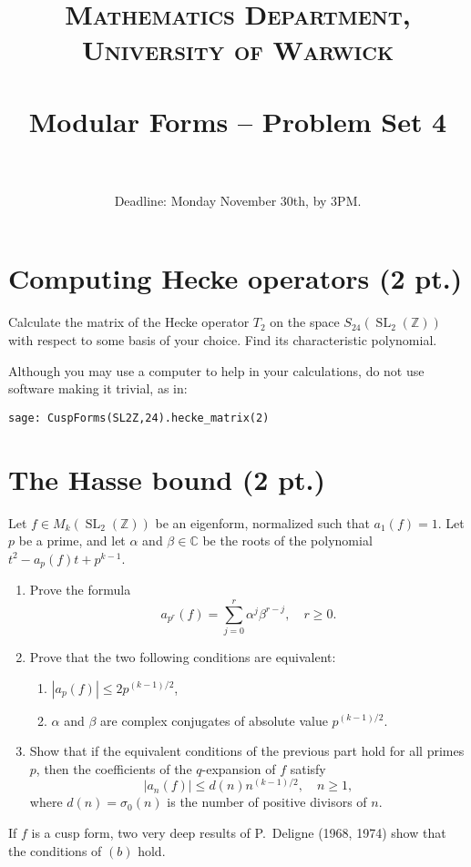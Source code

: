 \documentclass[paper=a4, fontsize=11pt]{scrartcl} %
\title{	
\normalfont \normalsize 
\textsc{Mathematics Department, University of Warwick} \\ [20pt] %
\horrule{0.5pt} \\[0.4cm] %
\huge Modular Forms -- Problem Set 4 \\ %
\horrule{2pt} \\ %
}
\date{Deadline: Monday November 30th, by 3PM.}
\numberwithin{equation}{section} %
\numberwithin{figure}{section} %
\numberwithin{table}{section} %
\newcommand{\bbC}{\mathbb{C}}
\newcommand{\bbZ}{\mathbb{Z}}
\newcommand{\CC}{\bbC}
\newcommand{\ZZ}{\bbZ}
\DeclareMathOperator{\SL}{SL}
\begin{document}
\maketitle %


\section{Computing Hecke operators (2 pt.)}
Calculate the matrix of the Hecke operator $T_2$ on the space $S_{24}(\SL_2(\ZZ))$ with respect to some basis of your choice. Find its characteristic polynomial.

Although you may use a computer to help in your calculations, do not use software making it trivial, as in:
\begin{verbatim}
sage: CuspForms(SL2Z,24).hecke_matrix(2)
\end{verbatim}


\section{The Hasse bound (2 pt.)}
Let $f\in M_k(\SL_2(\ZZ))$ be an eigenform, normalized such that $a_1(f)=1$. Let $p$ be a prime, and let $\alpha$ and $\beta\in \CC$ be the roots of the polynomial $t^2-a_p(f)t+p^{k-1}$.
\begin{enumerate}
\item Prove the formula
\[
a_{p^r}(f) = \sum_{j=0}^r \alpha^j \beta^{r-j},\quad r\geq 0.
\]
\item Prove that the two following conditions are equivalent:
  \begin{enumerate}
  \item $|a_p(f)|\leq 2p^{(k-1)/2}$,
  \item $\alpha$ and $\beta$ are complex conjugates of absolute value $p^{(k-1)/2}$.
  \end{enumerate}
\item Show that if the equivalent conditions of the previous part hold for all primes $p$, then the coefficients of the $q$-expansion of $f$ satisfy
\[
|a_n(f)|\leq d(n)n^{(k-1)/2},\quad n\geq 1,
\]
where $d(n)=\sigma_0(n)$ is the number of positive divisors of $n$.
\end{enumerate}
  If $f$ is a cusp form, two very deep results of P.~Deligne (1968,  1974) show that the conditions of $(b)$ hold.
\end{document}
